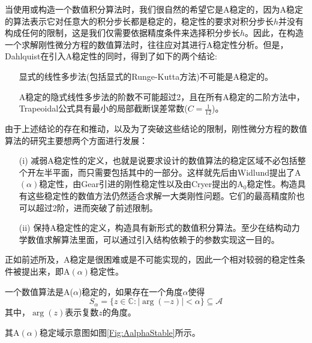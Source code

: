 当使用或构造一个数值积分算法时，我们很自然的希望它是A稳定的，因为A稳定的算法表示它对任意大的积分步长都是稳定的，稳定性的要求对积分步长$h$并没有构成任何的限制，这是我们仅需要依据精度条件来选择积分步长$h$。因此，在构造一个求解刚性微分方程的数值算法时，往往应对其进行A稳定性分析。但是，Dahlquist在引入A稳定性的同时，得到了如下的两个结论\cite{Dahlquist1963a,Wanner2006a,YuanZhaoDing1987a,ErnstHairer1996a,Hughes2000c}:
\begin{itemize}
\item[\ddag] 显式的线性多步法(包括显式的Runge-Kutta方法)不可能是A稳定的。
\item[\ddag] A稳定的隐式线性多步法的阶数不可能超过2，且在所有A稳定的二阶方法中，Trapeoidal公式具有最小的局部截断误差常数($C=\frac{1}{12}$)。
\end{itemize}
由于上述结论的存在和推动，以及为了突破这些结论的限制，刚性微分方程的数值算法的研究主要想两个方面进行发展：
\begin{itemize}
\item[(i)] 减弱A稳定性的定义，也就是说要求设计的数值算法的稳定区域不必包括整个开左半平面，而只需要包括其中的一部分。这样就先后由Widlund提出了A$(\alpha)$稳定性\cite{Widlund1967a}，由Gear引进的刚性稳定性\cite{Gear1971c}以及由Cryer提出的$\text{A}_0$稳定性\cite{Cryer1973a}。构造具有这些稳定性的数值方法仍然适合求解一大类刚性问题。它们的最高精度阶也可以超过2阶，进而突破了前述限制。
\item[(ii)] 保持A稳定性的定义，构造具有新形式的数值积分算法。至少在结构动力学数值求解算法里面，可以通过引入结构依赖于的参数实现这一目的。
\end{itemize}

正如前述所及，A稳定是很困难或是不可能实现的，因此一个相对较弱的稳定性条件被提出来，即A$(\alpha)$稳定性。
\begin{definition}
一个数值算法是A($\alpha$)稳定的\cite{Butcher2016a,LiShouFo2010a,Widlund1967a}，如果存在一个角度$\alpha$使得
\begin{equation}
S_\alpha=\{z\in\mathbb{C}:|\arg(-z)|<\alpha\}\subseteq\mathcal{A}
\end{equation}
其中，$\arg(z)$表示复数$z$的角度。
\end{definition}
其A$(\alpha)$稳定域示意图如图\ref{Fig:AalphaStable}所示。
\begin{figure}[htpb]
\centering
{}
\end{figure}

